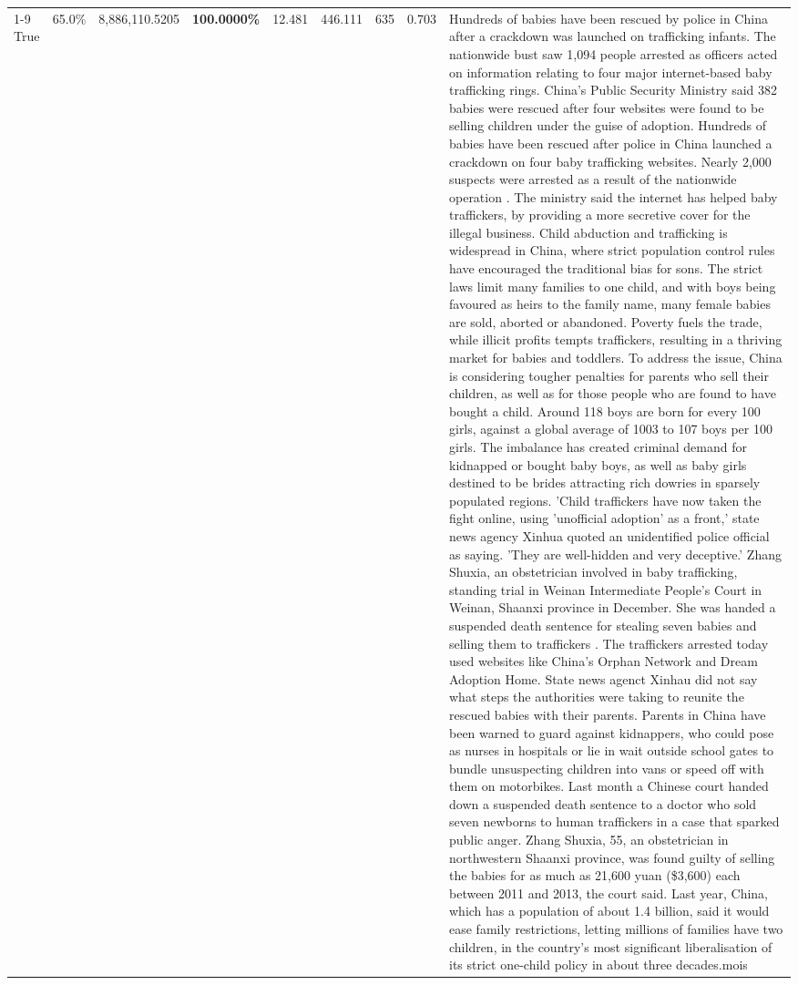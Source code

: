 \begin{table}[H]
\begin{tabular}{lllrlllll}
\cline{1-9}
True & 65.0\% & 8,886,110.5205 & \bfseries \color{red} 100.0000\% & 12.481 & 446.111 & 635 & 0.703 & Hundreds of babies have been rescued by police in China after a crackdown was launched on trafficking infants. The nationwide bust saw 1,094 people arrested as officers acted on information relating to four major internet-based baby trafficking rings. China's Public Security Ministry said 382 babies were rescued after four websites were found to be selling children under the guise of adoption. Hundreds of babies have been rescued after police in China launched a crackdown on four baby trafficking websites. Nearly 2,000 suspects were arrested as a result of the nationwide operation . The ministry said the internet has helped baby traffickers, by providing a more secretive cover for the illegal business. Child abduction and trafficking is widespread in China, where strict population control rules have encouraged the traditional bias for sons. The strict laws limit many families to one child, and with boys being favoured as heirs to the family name, many female babies are sold, aborted or abandoned. Poverty fuels the trade, while illicit profits tempts traffickers, resulting in a thriving market for babies and toddlers. To address the issue, China is considering tougher penalties for parents who sell their children, as well as for those people who are found to have bought a child. Around 118 boys are born for every 100 girls, against a global average of 1003 to 107 boys per 100 girls. The imbalance has created criminal demand for kidnapped or bought baby boys, as well as baby girls destined to be brides attracting rich dowries in sparsely populated regions. 'Child traffickers have now taken the fight online, using 'unofficial adoption' as a front,' state news agency Xinhua quoted an unidentified police official as saying. 'They are well-hidden and very deceptive.' Zhang Shuxia, an obstetrician involved in baby trafficking, standing trial in Weinan Intermediate People's Court in Weinan, Shaanxi province in December. She was handed a suspended death sentence for stealing seven babies and selling them to traffickers . The traffickers arrested today used websites like China's Orphan Network and Dream Adoption Home. State news agenct Xinhau did not say what steps the authorities were taking to reunite the rescued babies with their parents. Parents in China have been warned to guard against kidnappers, who could pose as nurses in hospitals or lie in wait outside school gates to bundle unsuspecting children into vans or speed off with them on motorbikes. Last month a Chinese court handed down a suspended death sentence to a doctor who sold seven newborns to human traffickers in a case that sparked public anger. Zhang Shuxia, 55, an obstetrician in northwestern Shaanxi province, was found guilty of selling the babies for as much as 21,600 yuan (\$3,600) each between 2011 and 2013, the court said. Last year, China, which has a population of about 1.4 billion, said it would ease family restrictions, letting millions of families have two children, in the country's most significant liberalisation of its strict one-child policy in about three decades.mois \\

\end{tabular}
\end{table}
